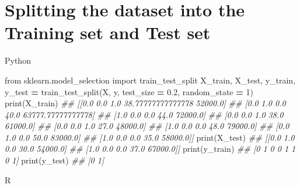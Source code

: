 \documentclass[
]{book}
\newenvironment{Shaded}{\begin{snugshade}}{\end{snugshade}}
\newcommand{\AttributeTok}[1]{\textcolor[rgb]{0.77,0.63,0.00}{#1}}
\newcommand{\BuiltInTok}[1]{#1}
\newcommand{\CommentTok}[1]{\textcolor[rgb]{0.56,0.35,0.01}{\textit{#1}}}
\newcommand{\ConstantTok}[1]{\textcolor[rgb]{0.00,0.00,0.00}{#1}}
\newcommand{\DecValTok}[1]{\textcolor[rgb]{0.00,0.00,0.81}{#1}}
\newcommand{\FloatTok}[1]{\textcolor[rgb]{0.00,0.00,0.81}{#1}}
\newcommand{\FunctionTok}[1]{\textcolor[rgb]{0.00,0.00,0.00}{#1}}
\newcommand{\ImportTok}[1]{#1}
\newcommand{\NormalTok}[1]{#1}
\newcommand{\OperatorTok}[1]{\textcolor[rgb]{0.81,0.36,0.00}{\textbf{#1}}}
\newcommand{\OtherTok}[1]{\textcolor[rgb]{0.56,0.35,0.01}{#1}}
\newcommand{\SpecialCharTok}[1]{\textcolor[rgb]{0.00,0.00,0.00}{#1}}
\theoremstyle{definition}
\theoremstyle{definition}
\theoremstyle{definition}
\theoremstyle{definition}
\theoremstyle{remark}
\begin{document}
\hypertarget{splitting-the-dataset-into-the-training-set-and-test-set}{%
\section{Splitting the dataset into the Training set and Test set}\label{splitting-the-dataset-into-the-training-set-and-test-set}}

Python

\begin{Shaded}
\begin{Highlighting}[]
\ImportTok{from}\NormalTok{ sklearn.model\_selection }\ImportTok{import}\NormalTok{ train\_test\_split}
\NormalTok{X\_train, X\_test, y\_train, y\_test }\OperatorTok{=}\NormalTok{ train\_test\_split(X, y, test\_size }\OperatorTok{=} \FloatTok{0.2}\NormalTok{, random\_state }\OperatorTok{=} \DecValTok{1}\NormalTok{)}
\BuiltInTok{print}\NormalTok{(X\_train)}
\CommentTok{\#\# [[0.0 0.0 1.0 38.77777777777778 52000.0]}
\CommentTok{\#\#  [0.0 1.0 0.0 40.0 63777.77777777778]}
\CommentTok{\#\#  [1.0 0.0 0.0 44.0 72000.0]}
\CommentTok{\#\#  [0.0 0.0 1.0 38.0 61000.0]}
\CommentTok{\#\#  [0.0 0.0 1.0 27.0 48000.0]}
\CommentTok{\#\#  [1.0 0.0 0.0 48.0 79000.0]}
\CommentTok{\#\#  [0.0 1.0 0.0 50.0 83000.0]}
\CommentTok{\#\#  [1.0 0.0 0.0 35.0 58000.0]]}
\BuiltInTok{print}\NormalTok{(X\_test)}
\CommentTok{\#\# [[0.0 1.0 0.0 30.0 54000.0]}
\CommentTok{\#\#  [1.0 0.0 0.0 37.0 67000.0]]}
\BuiltInTok{print}\NormalTok{(y\_train)}
\CommentTok{\#\# [0 1 0 0 1 1 0 1]}
\BuiltInTok{print}\NormalTok{(y\_test)}
\CommentTok{\#\# [0 1]}
\end{Highlighting}
\end{Shaded}

R

\begin{Shaded}
\end{Shaded}
\end{document}
